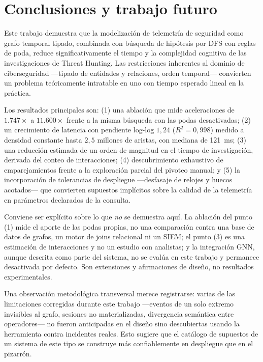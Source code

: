 \documentclass[11pt,a4paper]{article}
\begin{document}
\section{Conclusiones y trabajo futuro}
Este trabajo demuestra que la modelización de telemetría de seguridad como
grafo temporal tipado, combinada con búsqueda de hipótesis por DFS con reglas
de poda, reduce significativamente el tiempo y la complejidad cognitiva de las
investigaciones de Threat Hunting. Las restricciones inherentes al dominio de
ciberseguridad ---tipado de entidades y relaciones, orden temporal---
convierten un problema teóricamente intratable en uno con tiempo esperado
lineal en la práctica.

Los resultados principales son: (1) una ablación que mide aceleraciones de
$1.747\times$ a $11.600\times$ frente a la misma búsqueda con las podas
desactivadas; (2) un crecimiento de latencia con pendiente log-log $1{,}24$
($R^2 = 0{,}998$) medido a densidad constante hasta $2{,}5$ millones de
aristas, con mediana de 121~ms; (3) una reducción estimada de un orden de
magnitud en el tiempo de investigación, derivada del conteo de interacciones;
(4) descubrimiento exhaustivo de emparejamientos frente a la exploración
parcial del pivoteo manual; y (5) la incorporación de tolerancias de despliegue
---desfasaje de relojes y huecos acotados--- que convierten supuestos
implícitos sobre la calidad de la telemetría en parámetros declarados de la
consulta.

Conviene ser explícito sobre lo que \emph{no} se demuestra aquí. La ablación
del punto (1) mide el aporte de las podas propias, no una comparación contra
una base de datos de grafos, un motor de joins relacional ni un SIEM; el punto
(3) es una estimación de interacciones y no un estudio con analistas; y la
integración GNN, aunque descrita como parte del sistema, no se evalúa en este
trabajo y permanece desactivada por defecto. Son extensiones y afirmaciones de
diseño, no resultados experimentales.

Una observación metodológica transversal merece registrarse: varias de las
limitaciones corregidas durante este trabajo ---eventos de un solo extremo
invisibles al grafo, sesiones no materializadas, divergencia semántica entre
operadores--- no fueron anticipadas en el diseño sino descubiertas usando la
herramienta contra incidentes reales. Esto sugiere que el catálogo de supuestos
de un sistema de este tipo se construye más confiablemente en despliegue que en
el pizarrón.
\end{document}
